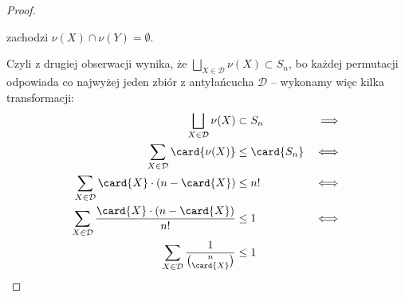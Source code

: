 \begin{proof}
\begin{enumerate}
		      zachodzi $\nu(X) \cap \nu(Y) = \emptyset$.
	\end{enumerate}
	Czyli z drugiej obserwacji wynika, że $\bigsqcup_{X \in \mathcal{D}} \nu(X) \subset S_n$, bo każdej permutacji
	odpowiada co najwyżej jeden zbiór z antyłańcucha $\mathcal{D}$ -- wykonamy więc kilka transformacji:
	\begin{align*}
		\bigsqcup_{X \in \mathcal{D}} \nu(X)                              & \subset S_n     & \implies \\
		\sum_{X \in \mathcal{D}} \card{\nu(X)}                            & \leq \card{S_n} & \iff     \\
		\sum_{X \in \mathcal{D}} \card{X} \cdot (n - \card{X})            & \leq n!         & \iff     \\
		\sum_{X \in \mathcal{D}} \frac{\card{X} \cdot (n - \card{X})}{n!} & \leq 1          & \iff     \\
		\sum_{X \in \mathcal{D}} \frac{1}{\binom{n}{\card{X}}}            & \leq 1
	\end{align*}
\end{proof}
